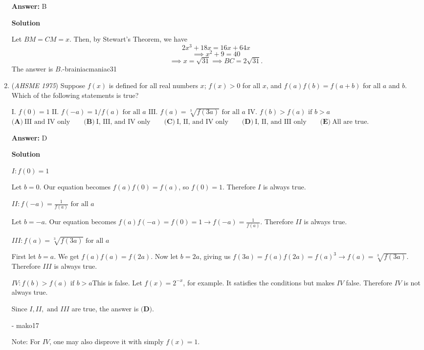 \begin{enumerate}
 \textbf{Answer: }B



\textbf{Solution}

Let $BM=CM=x$. Then, by Stewart's Theorem, we have
 \[2x^3+18x=16x+64x\]
 \[\implies x^2+9=40\]
 \[\implies x=\sqrt{31}\implies BC=\boxed{2\sqrt{31}}.\]The answer is $\boxed{B}.$-brainiacmaniac31

 


	\item (\textit{AHSME 1975}) Suppose $f(x)$ is defined for all real numbers $x$; $f(x)>0$ for all $x$, and $f(a)f(b)=f(a+b)$ for all $a$ and $b$. 
Which of the following statements is true? 


 $\text{I. } f(0)=1$
$\text{II. } f(-a)=1/f(a) \text{ for all } a$
$\text{III. } f(a) = \sqrt[3]{f(3a)} \text{ for all } a$
$\text{IV. } f(b)>f(a) \text{ if } b>a$
$\textbf{(A)}\ \text{III and IV only} \qquad  \textbf{(B)}\ \text{I, III, and IV only} \qquad  \textbf{(C)}\ \text{I, II, and IV only} \qquad  \textbf{(D)}\ \text{I, II, and III only} \qquad  \textbf{(E)}\ \text{All are true.}$

 \textbf{Answer: }D



\textbf{Solution}

$I: f(0) = 1$

 Let $b = 0$. Our equation becomes $f(a)f(0) = f(a)$, so $f(0) = 1$. Therefore $I$ is always true.

 
$II: f(-a) = \frac{1}{f(a)} \text{ for all } a$

 Let $b = -a$. Our equation becomes $f(a)f(-a) = f(0) = 1 \longrightarrow f(-a) = \frac{1}{f(a)}$. Therefore $II$ is always true.

 
$III: f(a) = \sqrt[3] {f(3a)} \text{ for all } a$

 First let $b = a$. We get $f(a)f(a) = f(2a)$. Now let $b = 2a$, giving us $f(3a) = f(a)f(2a) = f(a)^3 \longrightarrow f(a) = \sqrt[3] {f(3a)}$. Therefore $III$ is always true.

 
$IV: f(b) > f(a) \text{ if } b > a$This is false. Let $f(x) = 2^{-x}$, for example. It satisfies the conditions but makes $IV$ false. Therefore $IV$ is not always true.

 
Since $I, II, \text{ and } III$ are true, the answer is $\boxed{\textbf{(D)}}$.

 - mako17

 Note: For $IV$, one may also disprove it with simply $f(x) = 1$.

 



\end{enumerate}
